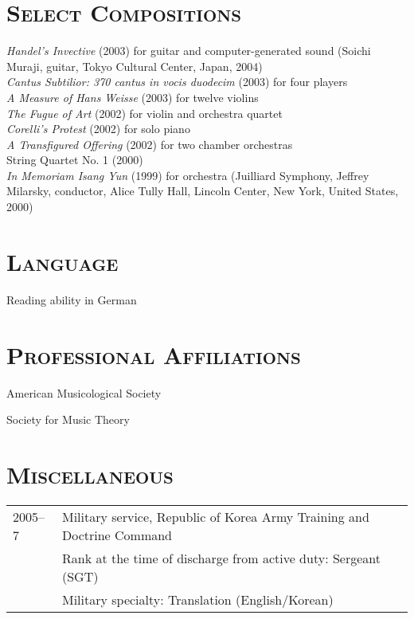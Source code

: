 \documentclass[a4,11pt,draft]{article}
\begin{document}
  \vspace{2.5mm}
  
  \section*{\textsc{Select Compositions}}
  
  \begin{hangparas}{15pt}{1}
    \textit{Handel’s Invective} (2003) for guitar and computer-generated sound (Soichi Muraji, guitar, Tokyo Cultural Center, Japan, 2004)\\[2mm]
  
    \textit{Cantus Subtilior: 370 cantus in vocis duodecim} (2003) for four players\\[2mm]
  
    \textit{A Measure of Hans Weisse} (2003) for twelve violins\\[2mm]
  
    \textit{The Fugue of Art} (2002) for violin and orchestra quartet\\[2mm]
  
    \textit{Corelli’s Protest} (2002) for solo piano\\[2mm]
  
    \textit{A Transfigured Offering} (2002) for two chamber orchestras\\[2mm]
  
    String Quartet No. 1 (2000)\\[2mm]
  
    \textit{In Memoriam Isang Yun} (1999) for orchestra (Juilliard Symphony, Jeffrey Milarsky, conductor, Alice Tully Hall, Lincoln Center, New York, United States, 2000)
  \end{hangparas}
  
  \vspace{5mm}
  
  \section*{\textsc{Language}}
  
  Reading ability in German
  
  \section*{\textsc{Professional Affiliations}}
  
  American Musicological Society
  
  \noindent Society for Music Theory
  
  \section*{\textsc{Miscellaneous}}
  
  \hspace*{-0.25cm}
  \begin{tabular}{p{2.5cm} l}
    2005–7 & Military service, Republic of Korea Army Training and Doctrine Command\\
    & Rank at the time of discharge from active duty: Sergeant (SGT)\\
    & Military specialty: Translation (English/Korean)
  \end{tabular}
\end{document}
